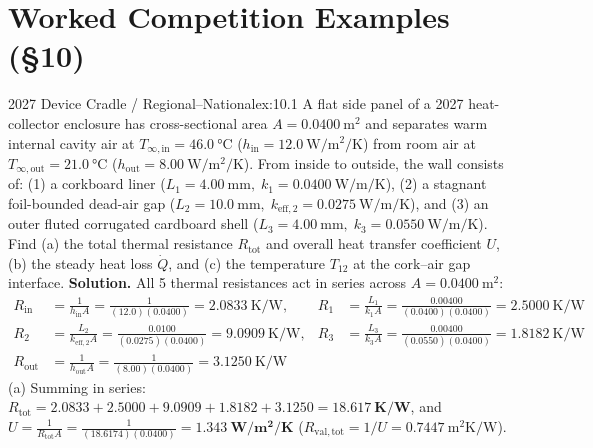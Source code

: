 \section{Worked Competition Examples (§10)}
\label{sec:10.5}

\begin{workedexample}{2027 Device Cradle / Regional--National}{ex:10.1}
A flat side panel of a 2027 heat-collector enclosure has cross-sectional area $A = \SI{0.0400}{\square\meter}$ and separates warm internal cavity air at $T_{\infty,\mathrm{in}} = \SI{46.0}{\celsius}$ ($h_{\mathrm{in}} = \SI{12.0}{\watt\per\square\meter\per\kelvin}$) from room air at $T_{\infty,\mathrm{out}} = \SI{21.0}{\celsius}$ ($h_{\mathrm{out}} = \SI{8.00}{\watt\per\square\meter\per\kelvin}$). From inside to outside, the wall consists of: (1) a corkboard liner ($L_1 = \SI{4.00}{\milli\meter},\; k_1 = \SI{0.0400}{\watt\per\meter\per\kelvin}$), (2) a stagnant foil-bounded dead-air gap ($L_2 = \SI{10.0}{\milli\meter},\; k_{\mathrm{eff},2} = \SI{0.0275}{\watt\per\meter\per\kelvin}$), and (3) an outer fluted corrugated cardboard shell ($L_3 = \SI{4.00}{\milli\meter},\; k_3 = \SI{0.0550}{\watt\per\meter\per\kelvin}$). Find (a) the total thermal resistance $R_{\mathrm{tot}}$ and overall heat transfer coefficient $U$, (b) the steady heat loss $\dot{Q}$, and (c) the temperature $T_{12}$ at the cork--air gap interface.
\tcblower
\textbf{Solution.} All 5 thermal resistances act in series across $A = \SI{0.0400}{\square\meter}$:
\begin{align*}
  R_{\mathrm{in}} &= \frac{1}{h_{\mathrm{in}}A} = \frac{1}{(12.0)(0.0400)} = \SI{2.0833}{\kelvin\per\watt}, &
  R_1 &= \frac{L_1}{k_1 A} = \frac{0.00400}{(0.0400)(0.0400)} = \SI{2.5000}{\kelvin\per\watt} \\
  R_2 &= \frac{L_2}{k_{\mathrm{eff},2}A} = \frac{0.0100}{(0.0275)(0.0400)} = \SI{9.0909}{\kelvin\per\watt}, &
  R_3 &= \frac{L_3}{k_3 A} = \frac{0.00400}{(0.0550)(0.0400)} = \SI{1.8182}{\kelvin\per\watt} \\
  R_{\mathrm{out}} &= \frac{1}{h_{\mathrm{out}}A} = \frac{1}{(8.00)(0.0400)} = \SI{3.1250}{\kelvin\per\watt}
\end{align*}
(a) Summing in series: $R_{\mathrm{tot}} = 2.0833 + 2.5000 + 9.0909 + 1.8182 + 3.1250 = \mathbf{\SI{18.617}{\kelvin\per\watt}}$, and $U = \frac{1}{R_{\mathrm{tot}}A} = \frac{1}{(18.6174)(0.0400)} = \mathbf{\SI{1.343}{\watt\per\square\meter\per\kelvin}}$ ($R_{\mathrm{val,tot}} = 1/U = \SI{0.7447}{\square\meter\kelvin\per\watt}$).\\

\end{workedexample}
